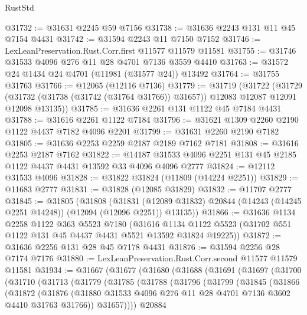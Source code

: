 \begin{lexlean}{RustStd}
\begin{coremodule}
@31732 := @31631 @2245 @59 @7156
@31738 := @31636 @2243 @131 @11 @45 @7154 @4431
@31742 := @31594 @2243 @11 @7150 @7152
@31746 := LexLeanPreservation.Rust.Corr.first @11577 @11579 @11581
@31755 := @31746 @31533 @4096 @276 @11 @28 @4701 @7136 @3559 @4410
@31763 := @31572 @24 @1434 @24 @4701 (@11981 (@31577 @24)) @13492
@31764 := @31755 @31763
@31766 := @12065 (@12116 @7136)
@31779 := @31719
    (@31722
      (@31729 (@31732 (@31738 (@31742 (@31764 @31766)) @31657)) @12083 @12087 @12091 @12098 @13135))
@31785 := @31636 @2261 @131 @1122 @45 @7184 @4431
@31788 := @31616 @2261 @1122 @7184
@31796 := @31621 @1309 @2260 @2190 @1122 @4437 @7182 @4096 @2201
@31799 := @31631 @2260 @2190 @7182
@31805 := @31636 @2253 @2259 @2187 @2189 @7162 @7181
@31808 := @31616 @2253 @2187 @7162
@31822 := @14187 @31533 @4096 @2251 @131 @45 @2185 @1122 @4437 @4431 @13592 @33 @4096 @4096 @2777
@31824 := @12112 @31533 @4096
@31828 := @31822 @31824 (@11809 (@14224 @2251))
@31829 := @11683 @2777
@31831 := @31828 (@12085 @31829)
@31832 := @11707 @2777
@31845 := @31805
    (@31808
      (@31831 (@12089 @31832) @20844 (@14243 (@14245 @2251 @14248)) (@12094 (@12096 @2251)) @13135))
@31866 := @31636
    @1134
    @2258
    @1122
    @363
    @5523
    @7180
    (@31616 @1134 @1122 @5523 (@31702 @551 @1122 @131 @45 @4437 @4431 @5521 @13592 @31824 @19225))
@31872 := @31636 @2256 @131 @28 @45 @7178 @4431
@31876 := @31594 @2256 @28 @7174 @7176
@31880 := LexLeanPreservation.Rust.Corr.second @11577 @11579 @11581
@31934 := @31667
    (@31677
      (@31680
        (@31688
          (@31691
            (@31697
              (@31700
                (@31710
                  (@31713
                    (@31779
                      (@31785
                        (@31788
                          (@31796
                            (@31799
                              (@31845
                                (@31866
                                  (@31872
                                    (@31876
                                      (@31880
                                        @31533
                                        @4096
                                        @276
                                        @11
                                        @28
                                        @4701
                                        @7136
                                        @3602
                                        @4410
                                        @31763
                                        @31766))
                                    @31657))))
                            @20884

\end{coremodule}
\end{lexlean}
